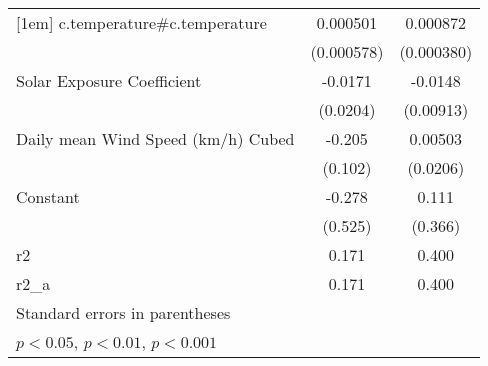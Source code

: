 {\begin{tabular}{l*{2}{c}}
[1em]
c.temperature#c.temperature&    0.000501         &    0.000872         \\
                    &  (0.000578)         &  (0.000380)         \\
[1em]
Solar Exposure Coefficient&     -0.0171         &     -0.0148         \\
                    &    (0.0204)         &   (0.00913)         \\
[1em]
Daily mean Wind Speed (km/h) Cubed&      -0.205         &     0.00503         \\
                    &     (0.102)         &    (0.0206)         \\
[1em]
Constant            &      -0.278         &       0.111         \\
                    &     (0.525)         &     (0.366)         \\
\hline
r2                  &       0.171         &       0.400         \\
r2\_a                &       0.171         &       0.400         \\
\hline\hline
\multicolumn{3}{l}{\footnotesize Standard errors in parentheses}\\
\multicolumn{3}{l}{\footnotesize \sym{*} \(p<0.05\), \sym{**} \(p<0.01\), \sym{***} \(p<0.001\)}\\
\end{tabular}
}
